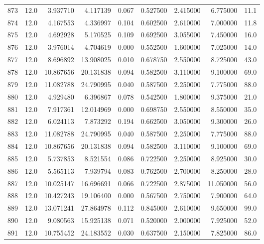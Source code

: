 \begin{tabular}{lrrrrrrrr}
873  &   12.0 &   3.937710 &   4.117139 &  0.067 &  0.527500 &  2.415000 &   6.775000 &   11.1 \\
874  &   12.0 &   4.167553 &   4.336997 &  0.104 &  0.602500 &  2.610000 &   7.000000 &   11.8 \\
875  &   12.0 &   4.692928 &   5.170525 &  0.109 &  0.692500 &  3.055000 &   7.450000 &   16.0 \\
876  &   12.0 &   3.976014 &   4.704619 &  0.000 &  0.552500 &  1.600000 &   7.025000 &   14.0 \\
877  &   12.0 &   8.696892 &  13.908025 &  0.010 &  0.678750 &  2.550000 &   8.725000 &   43.0 \\
878  &   12.0 &  10.867656 &  20.131838 &  0.094 &  0.582500 &  3.110000 &   9.100000 &   69.0 \\
879  &   12.0 &  11.082788 &  24.790995 &  0.040 &  0.587500 &  2.250000 &   7.775000 &   88.0 \\
880  &   12.0 &   4.929480 &   6.396867 &  0.078 &  0.542500 &  1.800000 &   9.375000 &   21.0 \\
881  &   12.0 &   7.917361 &  12.014969 &  0.000 &  0.698750 &  2.550000 &   8.550000 &   35.0 \\
882  &   12.0 &   6.024113 &   7.873292 &  0.194 &  0.662500 &  3.050000 &   9.300000 &   26.0 \\
883  &   12.0 &  11.082788 &  24.790995 &  0.040 &  0.587500 &  2.250000 &   7.775000 &   88.0 \\
884  &   12.0 &  10.867656 &  20.131838 &  0.094 &  0.582500 &  3.110000 &   9.100000 &   69.0 \\
885  &   12.0 &   5.737853 &   8.521554 &  0.086 &  0.722500 &  2.250000 &   8.925000 &   30.0 \\
886  &   12.0 &   5.565113 &   7.939794 &  0.083 &  0.762500 &  2.700000 &   8.250000 &   28.0 \\
887  &   12.0 &  10.025147 &  16.696691 &  0.066 &  0.722500 &  2.875000 &  11.050000 &   56.0 \\
888  &   12.0 &  10.427243 &  19.106400 &  0.000 &  0.567500 &  2.750000 &   7.900000 &   64.0 \\
889  &   12.0 &  13.071241 &  27.864978 &  0.112 &  0.845000 &  2.610000 &   9.650000 &   99.0 \\
890  &   12.0 &   9.080563 &  15.925138 &  0.071 &  0.520000 &  2.000000 &   7.925000 &   52.0 \\
891  &   12.0 &  10.755452 &  24.183552 &  0.030 &  0.637500 &  2.150000 &   7.825000 &   86.0 \\

\end{tabular}
